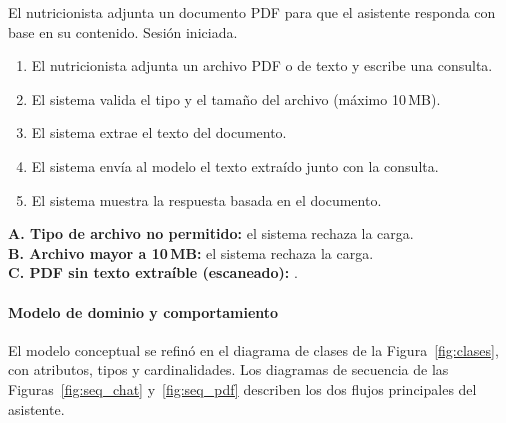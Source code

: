 {
{El nutricionista adjunta un documento PDF para que el asistente responda con base en su contenido.}
{Sesión iniciada.}
{\begin{enumerate}[nosep]
 \item El nutricionista adjunta un archivo PDF o de texto y escribe una consulta.
 \item El sistema valida el tipo y el tamaño del archivo (máximo 10\,MB).
 \item El sistema extrae el texto del documento.
 \item El sistema envía al modelo el texto extraído junto con la consulta.
 \item El sistema muestra la respuesta basada en el documento.
\end{enumerate}}
{\textbf{A. Tipo de archivo no permitido:} el sistema rechaza la carga.\\
 \textbf{B. Archivo mayor a 10\,MB:} el sistema rechaza la carga.\\
 \textbf{C. PDF sin texto extraíble (escaneado):} .}
}

\paragraph{Modelo de dominio y comportamiento}

El modelo conceptual se refinó en el diagrama de clases de la
Figura~\ref{fig:clases}, con atributos, tipos y cardinalidades. Los diagramas
de secuencia de las Figuras~\ref{fig:seq_chat} y~\ref{fig:seq_pdf} describen los
dos flujos principales del asistente.

